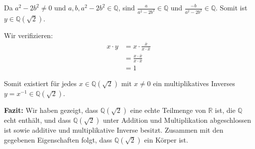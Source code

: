 \documentclass{article}
\newcommand{\Q}{\mathbb{Q}}
\newcommand{\R}{\mathbb{R}}
\newcommand{\adjunction}[2]{#1(#2)}
\begin{document}
\begin{enumerate}
Da \(a^2 - 2b^2 \neq 0\) und \(a, b, a^2 - 2b^2 \in \Q\), sind \(\frac{a}{a^2 - 2b^2} \in \Q\) und \(\frac{-b}{a^2 - 2b^2} \in \Q\).
Somit ist \(y \in \adjunction{\Q}{\sqrt{2}}\).

Wir verifizieren:
\begin{align}
x \cdot y &= x \cdot \frac{\overline{x}}{x \cdot \overline{x}}\\
&= \frac{x \cdot \overline{x}}{x \cdot \overline{x}}\\
&= 1
\end{align}

Somit existiert für jedes \(x \in \adjunction{\Q}{\sqrt{2}}\) mit \(x \neq 0\) ein multiplikatives Inverses \(y = x^{-1} \in \adjunction{\Q}{\sqrt{2}}\).
\end{enumerate}

\textbf{Fazit:} Wir haben gezeigt, dass \(\adjunction{\Q}{\sqrt{2}}\) eine echte Teilmenge von \(\R\) ist, die \(\Q\) echt enthält,
und dass \(\adjunction{\Q}{\sqrt{2}}\) unter Addition und Multiplikation abgeschlossen ist sowie additive und multiplikative Inverse besitzt.
Zusammen mit den gegebenen Eigenschaften folgt, dass \(\adjunction{\Q}{\sqrt{2}}\) ein Körper ist.
\end{document}
